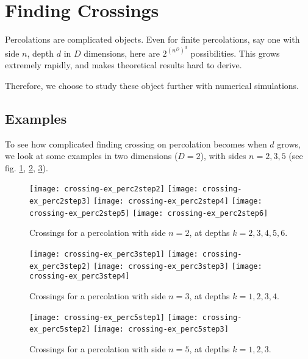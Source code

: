 \section{Finding Crossings}
Percolations are complicated objects.
Even for finite percolations, say one with side $n$, depth $d$ in $D$ dimensions, here are $2^{\left( n^D \right)^d}$ possibilities.
This grows extremely rapidly, and makes theoretical results hard to derive.

Therefore, we choose to study these object further with numerical simulations.

\subsection{Examples}
To see how complicated finding crossing on percolation becomes when $d$ grows, we look at some examples in two dimensions ($D=2$), with sides $n=2,3,5$ (see fig. \ref{fig:crossingExPerc2}, \ref{fig:crossingExPerc3}, \ref{fig:crossingExPerc5}).
\begin{figure}[!h]
	\texttt{[image: crossing-ex\_perc2step2]}
	\hspace{0.1cm}
	\texttt{[image: crossing-ex\_perc2step3]}
	\hspace{0.1cm}
	\texttt{[image: crossing-ex\_perc2step4]}
	\hspace{0.1cm}
	\texttt{[image: crossing-ex\_perc2step5]}
	\hspace{0.1cm}
	\texttt{[image: crossing-ex\_perc2step6]}
	\centering
	\caption{Crossings for a percolation with side $n=2$, at depths $k=2,3,4,5,6$.}
	\label{fig:crossingExPerc2}
\end{figure}
\begin{figure}[!h]
	\texttt{[image: crossing-ex\_perc3step1]}
	\hspace{0.1cm}
	\texttt{[image: crossing-ex\_perc3step2]}
	\hspace{0.1cm}
	\texttt{[image: crossing-ex\_perc3step3]}
	\hspace{0.1cm}
	\texttt{[image: crossing-ex\_perc3step4]}
	\centering
	\caption{Crossings for a percolation with side $n=3$, at depths $k=1,2,3,4$.}
	\label{fig:crossingExPerc3}
\end{figure}
\begin{figure}[!h]
	\texttt{[image: crossing-ex\_perc5step1]}
	\hspace{0.9cm}
	\texttt{[image: crossing-ex\_perc5step2]}
	\hspace{0.9cm}
	\texttt{[image: crossing-ex\_perc5step3]}
	\centering
	\caption{Crossings for a percolation with side $n=5$, at depths $k=1,2,3$.}
	\label{fig:crossingExPerc5}
\end{figure}

